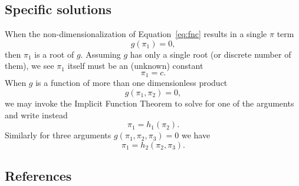 \documentclass[11pt]{article}
\begin{document}
\subsection{Specific solutions}
When the non-dimensionalization of Equation~\ref{eq:fnc} results in a single $\pi$ term
\begin{equation}
    g(\pi_1) = 0,
\end{equation}
then $\pi_1$ is a root of $g$. Assuming $g$ has only a single root (or discrete number of them), we see $\pi_1$ itself must be an (unknown) constant
\begin{equation}
    \pi_1 = c.
\end{equation}
When $g$ is a function of more than one dimensionless product
\begin{equation}
    g(\pi_1, \pi_2) = 0,
\end{equation}
we may invoke the Implicit Function Theorem to solve for one of the arguments and write instead
\begin{equation}
    \pi_1 = h_1(\pi_2).
\end{equation}
Similarly for three arguments $g(\pi_1, \pi_2, \pi_3) = 0$ we have
\begin{equation}
    \pi_1 = h_2(\pi_2, \pi_3).
\end{equation}

\subsection{References}

\begingroup
\renewcommand{\section}[2]{}%

\endgroup
\end{document}
